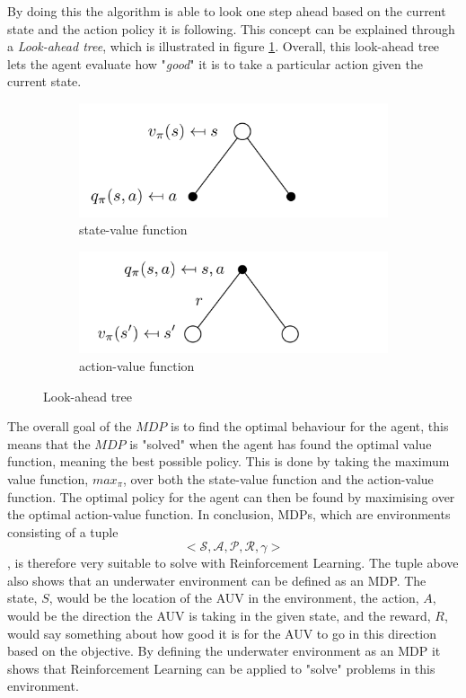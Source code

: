 By doing this the algorithm is able to look one step ahead based on the current state and the action policy it is following. This concept can be explained through a \textit{Look-ahead tree}, which is illustrated in figure \ref{fig:lookahead}. Overall, this look-ahead tree lets the agent evaluate how "\textit{good}" it is to take a particular action given the current state. 
\begin{figure}[H]
    \centering
    \begin{subfigure}[b]{0.45\textwidth}
        \centering
        \includegraphics[width=\textwidth]{images/chap2/look-ahead-value.png}
        \caption{state-value function}
    \end{subfigure}
    \hfill
    \begin{subfigure}[b]{0.45\textwidth}
        \centering
        \includegraphics[width=\textwidth]{images/chap2/look-ahead-action-value.png}
        \caption{action-value function}
    \end{subfigure}
    \caption{Look-ahead tree\cite{Silver}}
    \label{fig:lookahead}
\end{figure}
The overall goal of the $MDP$ is to find the optimal behaviour for the agent, this means that the $MDP$ is "solved" when the agent has found the optimal value function, meaning the best possible policy. This is done by taking the maximum value function, $max_{\pi}$, over both the state-value function and the action-value function. The optimal policy for the agent can then be found by maximising over the optimal action-value function. In conclusion, MDPs, which are environments consisting of a tuple $$<\mathcal{S, A, P, R, \gamma}>$$, is therefore very suitable to solve with Reinforcement Learning. The tuple above also shows that an underwater environment can be defined as an MDP. The state, $S$, would be the location of the AUV in the environment, the action, $A$, would be the direction the AUV is taking in the given state, and the reward, $R$, would say something about how good it is for the AUV to go in this direction based on the objective. By defining the underwater environment as an MDP it shows that Reinforcement Learning can be applied to "solve" problems in this environment.
